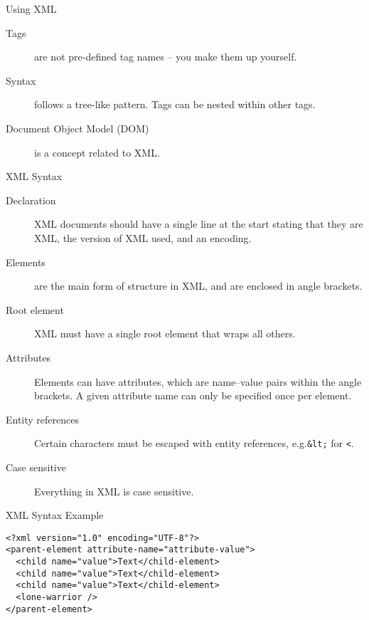 \begin{frame}{Using XML}
  \begin{description}
    \item[Tags] are not pre-defined tag names -- you make them up yourself.
    \item[Syntax] follows a tree-like pattern. Tags can be nested within other tags.
    \item[Document Object Model (DOM)] is a concept related to XML.
  \end{description}
\end{frame}


\begin{frame}{XML Syntax}
  \begin{description}
    \item[Declaration] XML documents should have a single line at the start stating that they are XML, the version of XML used, and an encoding.
    \item[Elements] are the main form of structure in XML, and are enclosed in angle brackets.
    \item[Root element] XML must have a single root element that wraps all others.
    \item[Attributes] Elements can have attributes, which are name--value pairs within the angle brackets. A given attribute name can only be specified once per element.
    \item[Entity references] Certain characters must be escaped with entity references, e.g.\texttt{&lt;} for \texttt{<}.
    \item[Case sensitive] Everything in XML is case sensitive.
  \end{description}
\end{frame}

\begin{frame}[fragile]{XML Syntax Example}
  \begin{verbatim}
<?xml version="1.0" encoding="UTF-8"?>
<parent-element attribute-name="attribute-value">
  <child name="value">Text</child-element>
  <child name="value">Text</child-element>
  <child name="value">Text</child-element>
  <lone-warrior />
</parent-element>
  \end{verbatim}
\end{frame}

